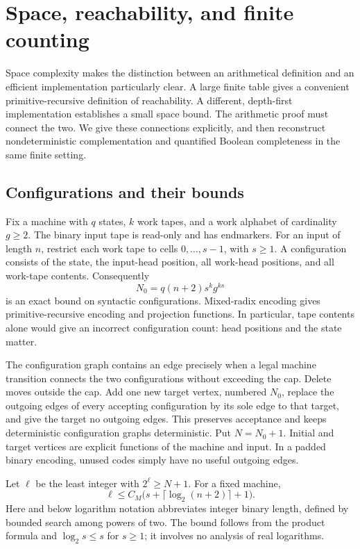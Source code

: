 \section{Space, reachability, and finite counting}
\label{sec:space}

Space complexity makes the distinction between an arithmetical definition and
an efficient implementation particularly clear. A large finite table gives a
convenient primitive-recursive definition of reachability. A different,
depth-first implementation establishes a small space bound. The arithmetic
proof must connect the two. We give these connections explicitly, and then
reconstruct nondeterministic complementation and quantified Boolean
completeness in the same finite setting.

\subsection{Configurations and their bounds}

Fix a machine with $q$ states, $k$ work tapes, and a work alphabet of cardinality
$g\geq 2$. The binary input tape is read-only and has endmarkers. For an input
of length $n$, restrict each work tape to cells $0,\ldots,s-1$, with $s\geq 1$.
A configuration consists of the state, the input-head position, all work-head
positions, and all work-tape contents. Consequently
\[
 N_0=q(n+2)s^k g^{ks}
\]
is an exact bound on syntactic configurations. Mixed-radix encoding gives
primitive-recursive encoding and projection functions. In particular, tape
contents alone would give an incorrect configuration count: head positions
and the state matter.

The configuration graph contains an edge precisely when a legal machine
transition connects the two configurations without exceeding the cap. Delete
moves outside the cap. Add one new target vertex, numbered $N_0$, replace
the outgoing edges of every accepting configuration by its sole edge to
that target, and give the target no outgoing edges. This preserves
acceptance and keeps deterministic configuration graphs deterministic.
Put $N=N_0+1$. Initial and
target vertices are explicit functions of the machine and input. In a padded
binary encoding, unused codes simply have no useful outgoing edges.

Let $\ell$ be the least integer with $2^\ell\geq N+1$. For a fixed machine,
\[
 \ell\leq C_M\bigl(s+\lceil\log_2(n+2)\rceil+1\bigr).
\]
Here and below logarithm notation abbreviates integer binary length, defined
by bounded search among powers of two. The bound follows from the product
formula and $\log_2 s\leq s$ for $s\geq1$; it involves no analysis of real
logarithms.

